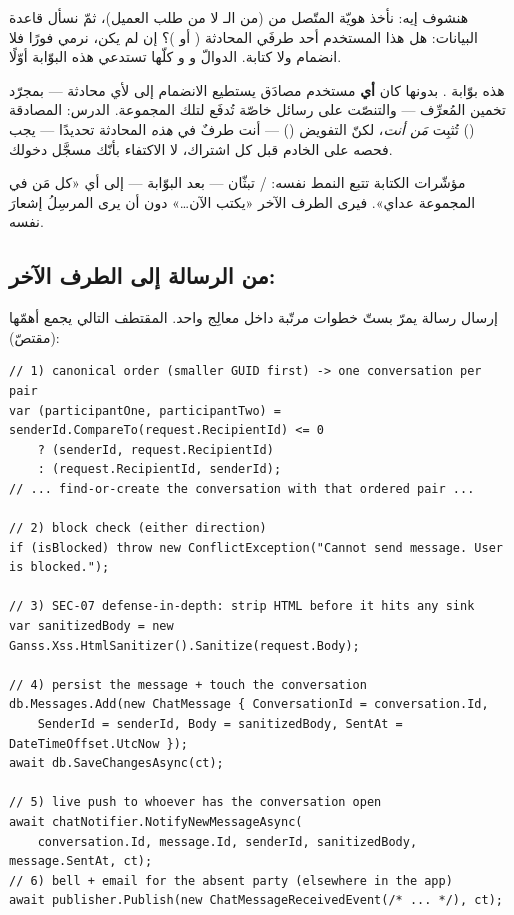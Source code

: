 هنشوف إيه: نأخذ هويّة المتّصل من  (من الـ لا من
طلب العميل)، ثمّ نسأل قاعدة البيانات: هل هذا المستخدم أحد طرفَي المحادثة
( أو )؟ إن لم يكن، نرمي
 فورًا فلا انضمام ولا كتابة. الدوالّ 
و و كلّها تستدعي هذه البوّابة أوّلًا.

\begin{secnote}
هذه بوّابة . بدونها كان \textbf{أي} مستخدم مصادَق يستطيع الانضمام
إلى  لأي محادثة — بمجرّد تخمين المُعرِّف — والتنصّت على
رسائل خاصّة تُدفَع لتلك المجموعة. الدرس: المصادقة () تُثبِت
\emph{مَن أنت}، لكنّ التفويض () — أنت طرفٌ في \emph{هذه}
المحادثة تحديدًا — يجب فحصه على الخادم قبل كل اشتراك، لا الاكتفاء بأنّك مسجَّل
دخولك.
\end{secnote}

مؤشّرات الكتابة تتبع النمط نفسه: / تبثّان — بعد
البوّابة — إلى  أي «كل مَن في المجموعة عداي». فيرى الطرف الآخر
«يكتب الآن…» دون أن يرى المرسِلُ إشعارَ نفسه.

\subsection{من الرسالة إلى الطرف الآخر: }

إرسال رسالة يمرّ بستّ خطوات مرتّبة داخل معالِج واحد. المقتطف التالي يجمع أهمّها
(مقتصّ):

\begin{english}
\begin{lstlisting}[language={[Sharp]C}]
// 1) canonical order (smaller GUID first) -> one conversation per pair
var (participantOne, participantTwo) = senderId.CompareTo(request.RecipientId) <= 0
    ? (senderId, request.RecipientId)
    : (request.RecipientId, senderId);
// ... find-or-create the conversation with that ordered pair ...

// 2) block check (either direction)
if (isBlocked) throw new ConflictException("Cannot send message. User is blocked.");

// 3) SEC-07 defense-in-depth: strip HTML before it hits any sink
var sanitizedBody = new Ganss.Xss.HtmlSanitizer().Sanitize(request.Body);

// 4) persist the message + touch the conversation
db.Messages.Add(new ChatMessage { ConversationId = conversation.Id,
    SenderId = senderId, Body = sanitizedBody, SentAt = DateTimeOffset.UtcNow });
await db.SaveChangesAsync(ct);

// 5) live push to whoever has the conversation open
await chatNotifier.NotifyNewMessageAsync(
    conversation.Id, message.Id, senderId, sanitizedBody, message.SentAt, ct);
// 6) bell + email for the absent party (elsewhere in the app)
await publisher.Publish(new ChatMessageReceivedEvent(/* ... */), ct);
\end{lstlisting}
\end{english}

